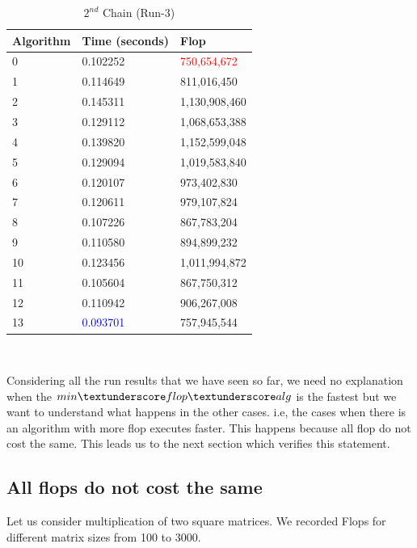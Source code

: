 \documentclass[10pts]{article}
\begin{document}
\begin{table}[htp!]
	\centering
	\begin{center}
	\begin{tabular}{| l | l | l |}
		\hline
		\textbf{Algorithm}  & \textbf{Time} (seconds) & \textbf{Flop}\\
		\hline		
			0 &	0.102252 &	\textcolor{red}{750,654,672} 	\\	
			1 &	0.114649 &	811,016,450 	\\	
			2 &	0.145311 &	1,130,908,460 	\\	
			3 &	0.129112 &	1,068,653,388 	\\	
			4 &	0.139820 &	1,152,599,048 	\\	
			5 &	0.129094 &	1,019,583,840 	\\	
			6 &	0.120107 &	973,402,830 	\\	
			7 &	0.120611 &	979,107,824 	\\	
			8 &	0.107226 &	867,783,204 	\\	
			9 &	0.110580 &	894,899,232 	\\	
			10 &	0.123456& 	1,011,994,872 \\ 		
			11 	&0.105604 	&867,750,312 		 \\
			12 	&0.110942 	&906,267,008 		\\
			13 	& \textcolor{blue}{0.093701} 	&757,945,544	\\
			\hline
		\end{tabular}\\
	\end{center}
	\caption{$2^{nd}$ Chain (Run-3)}
	\label{table:$2^{nd}$ Chain (Run-3)}
\end{table} 




Considering all the run results that we have seen so far, we need no explanation when the $min\textunderscore flop\textunderscore alg$ is the fastest but we want to understand what happens in the other cases. i.e, the cases when there is an algorithm with more flop executes faster. This happens because all flop do not cost the same.  This leads us to the next section which verifies this statement.
	
\subsection*{All flops do not cost the same}
 Let us consider multiplication of two square matrices. We recorded Flops for different matrix sizes from 100 to 3000. 
\end{document}
